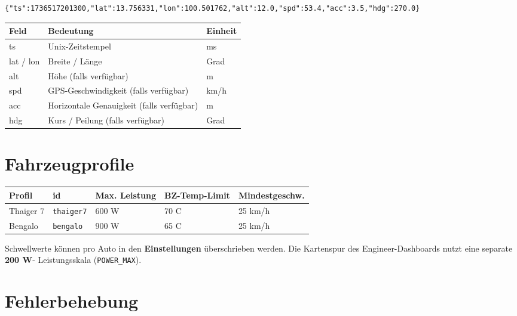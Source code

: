 \documentclass[11pt,a4paper,oneside]{report}
\newcommand{\degC}{\textdegree C}
\newcommand{\code}[1]{\texttt{#1}}
\begin{document}
\begin{lstlisting}
{"ts":1736517201300,"lat":13.756331,"lon":100.501762,"alt":12.0,"spd":53.4,"acc":3.5,"hdg":270.0}
\end{lstlisting}

\begin{tabularx}{\linewidth}{@{}lLl@{}}
\toprule
\textbf{Feld} & \textbf{Bedeutung} & \textbf{Einheit}\\
\midrule
ts & Unix-Zeitstempel & ms\\
lat / lon & Breite / L\"ange & Grad\\
alt & H\"ohe (falls verf\"ugbar) & m\\
spd & GPS-Geschwindigkeit (falls verf\"ugbar) & km/h\\
acc & Horizontale Genauigkeit (falls verf\"ugbar) & m\\
hdg & Kurs / Peilung (falls verf\"ugbar) & Grad\\
\bottomrule
\end{tabularx}

\section{Fahrzeugprofile}

\begin{tabularx}{\linewidth}{@{}llllL@{}}
\toprule
\textbf{Profil} & \textbf{id} & \textbf{Max. Leistung} & \textbf{BZ-Temp-Limit} & \textbf{Mindestgeschw.}\\
\midrule
Thaiger 7 & \code{thaiger7} & 600 W & 70 \degC{} & 25 km/h\\
Bengalo & \code{bengalo} & 900 W & 65 \degC{} & 25 km/h\\
\bottomrule
\end{tabularx}

\medskip
Schwellwerte k\"onnen pro Auto in den \textbf{Einstellungen} \"uberschrieben
werden. Die Kartenspur des Engineer-Dashboards nutzt eine separate \textbf{200 W}-
Leistungsskala (\code{POWER\_MAX}).

\section{Fehlerbehebung}
\end{document}

